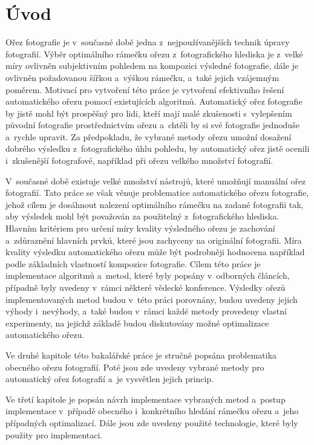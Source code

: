 
\chapter{Úvod}
Ořez fotografie je v~současné době jedna z~nejpoužívanějších technik úpravy fotografií. Výběr optimálního rámečku ořezu z~fotografického hlediska je z~velké míry ovlivněn subjektivním pohledem na kompozici výsledné fotografie, dále je ovlivněn požadovanou šířkou a~výškou rámečku, a~také jejich vzájemným poměrem. Motivací pro vytvoření této práce je vytvoření efektivního řešení automatického ořezu pomocí existujících algoritmů. Automatický ořez fotografie by jistě mohl být prospěšný pro lidi, kteří mají malé zkušenosti s~vylepšením původní fotografie prostřednictvím ořezu a~chtěli by si své fotografie jednoduše a~rychle upravit. Za předpokladu, že vybrané metody ořezu umožní dosažení dobrého výsledku z~fotografického úhlu pohledu, by automatický ořez jistě ocenili i~zkušenější fotografové, například při ořezu velkého množství fotografií.

V~současné době existuje velké množství nástrojů, které umožňují manuální ořez fotografií. Tato práce se však věnuje problematice automatického ořezu fotografie, jehož cílem je dosáhnout nalezení optimálního rámečku na zadané fotografii tak, aby výsledek mohl být považován za použitelný z~fotografického hlediska. Hlavním kritériem pro určení míry kvality výsledného ořezu je zachování a~zdůraznění hlavních prvků, které jsou zachyceny na originální fotografii. Míra kvality výsledku automatického ořezu může být podrobněji hodnocena například podle základních vlastností kompozice fotografie. Cílem této práce je implementace algoritmů a~metod, které byly popsány v~odborných článcích, případně byly uvedeny v~rámci některé vědecké konference. Výsledky ořezů implementovaných metod budou v~této práci porovnány, budou uvedeny jejich výhody i~nevýhody, a~také budou v~rámci každé metody provedeny vlastní experimenty, na jejichž základě budou diskutovány možné optimalizace automatického ořezu.

Ve druhé kapitole této bakalářské práce je stručně popsána problematika obecného ořezu fotografií. Poté jsou zde uvedeny vybrané metody pro automatický ořez fotografií a~je vysvětlen jejich princip.

Ve třetí kapitole je popsán návrh implementace vybraných metod a~postup implementace v~případě obecného i~konkrétního hledání rámečku ořezu a~jeho případných optimalizací. Dále jsou zde uvedeny použité technologie, které byly použity pro implementaci.

